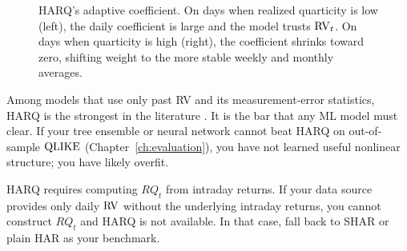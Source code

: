 \begin{figure}[htbp]
\centering
{}
\caption{HARQ's adaptive coefficient.
On days when realized quarticity is low (left), the daily coefficient is large and the model trusts $\operatorname{RV}_t$.
On days when quarticity is high (right), the coefficient shrinks toward zero, shifting weight to the more stable weekly and monthly averages.}
\label{fig:harq-coefficient}
\end{figure}

\begin{keyidea}
Among models that use only past RV and its measurement-error statistics, HARQ is the strongest in the literature \citep{BPQ2016}.
It is the bar that any ML model must clear.
If your tree ensemble or neural network cannot beat HARQ on out-of-sample $\operatorname{QLIKE}$ (Chapter~\ref{ch:evaluation}), you have not learned useful nonlinear structure; you have likely overfit.
\end{keyidea}

\begin{warning}
HARQ requires computing $RQ_t$ from intraday returns.
If your data source provides only daily $\operatorname{RV}$ without the underlying intraday returns, you cannot construct $RQ_t$ and HARQ is not available.
In that case, fall back to SHAR or plain HAR as your benchmark.
\end{warning}


